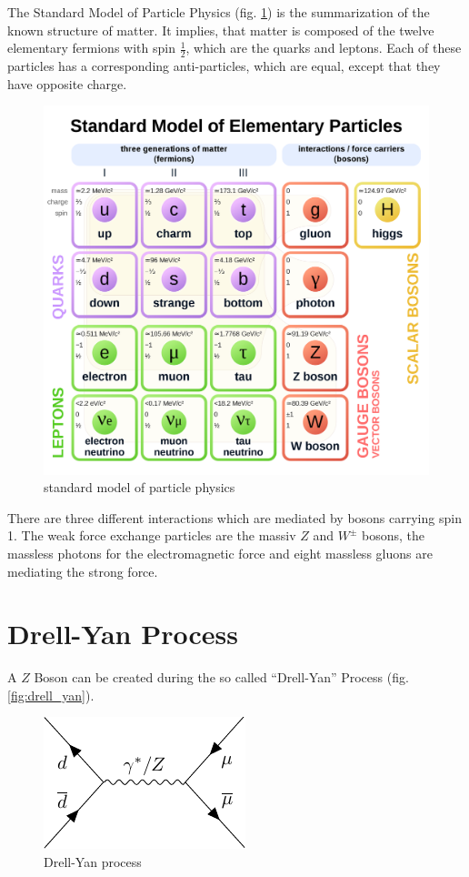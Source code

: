 \documentclass[12pt, a4paper, bibliography=totoc]{scrreprt}
\begin{document}
The Standard Model of Particle Physics (fig. \ref{fig:standard_model}) is the summarization of the known structure of matter.
It implies, that matter is composed of the twelve elementary fermions with spin $\frac{1}{2}$, which are the quarks and leptons. 
Each of these particles has a corresponding anti-particles, which are equal, except that they have opposite charge.

\begin{figure}[h]
\centering
\includegraphics[scale=0.13]{fig/standard_model.png}
\caption{standard model of particle physics}
\label{fig:standard_model}
\end{figure}

There are three different interactions which are mediated by bosons carrying spin 1.
The weak force exchange particles are the massiv $Z$ and $W^{\pm}$ bosons, the massless photons for the electromagnetic force and eight massless gluons are mediating the strong force. 
 
\section{Drell-Yan Process}
A $Z$ Boson can be created during the so called ``Drell-Yan'' Process (fig. \ref{fig:drell_yan}). 


\begin{figure}[h]
\centering
\includegraphics[scale=1]{fig/feynman_1.pdf}
\caption{Drell-Yan process}
\label{fig:drel_yan}
\end{figure}
\end{document}

